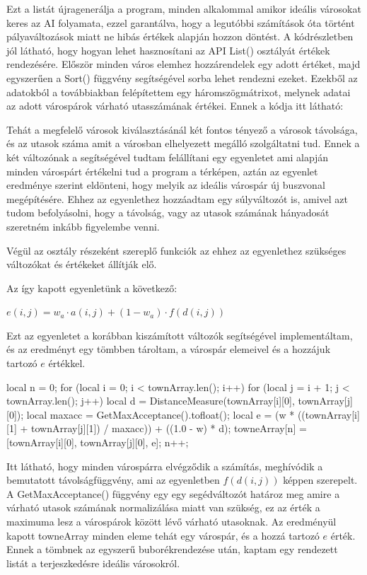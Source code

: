 Ezt a listát újragenerálja a program, minden alkalommal amikor ideális városokat keres az AI folyamata, ezzel garantálva, hogy a legutóbbi számítások óta történt pályaváltozások miatt ne hibás értékek alapján hozzon döntést. A kódrészletben jól látható, hogy hogyan lehet hasznosítani az API List() osztályát értékek rendezésére. Először minden város elemhez hozzárendelek egy adott értéket, majd egyszerűen a Sort() függvény segítségével sorba lehet rendezni ezeket. Ezekből az adatokból a továbbiakban felépítettem egy háromszögmátrixot, melynek adatai az adott várospárok várható utasszámának értékei. Ennek a kódja itt látható:

Tehát a megfelelő városok kiválasztásánál két fontos tényező a városok távolsága, és az utasok száma amit a városban elhelyezett megálló szolgáltatni tud. Ennek a két változónak a segítségével tudtam felállítani egy egyenletet ami alapján minden várospárt értékelni tud a program a térképen, aztán az egyenlet eredménye szerint eldönteni, hogy melyik az ideális várospár új buszvonal megépítésére. Ehhez az egyenlethez hozzáadtam egy súlyváltozót is, amivel azt tudom befolyásolni, hogy a távolság, vagy az utasok számának hányadosát szeretném inkább figyelembe venni.

Végül az osztály részeként szereplő funkciók az ehhez az egyenlethez szükséges változókat és értékeket állítják elő.

Az így kapott egyenletünk a következő:
\begin{center}
	$ e(i,j)=w_{a} \cdot a(i,j)+(1-w_{a}) \cdot f(d(i,j)) $
\end{center}

Ezt az egyenletet a korábban kiszámított változók segítségével implementáltam, és az eredményt egy tömbben tároltam, a várospár elemeivel és a hozzájuk tartozó $e$ értékkel.

\begin{cpp}
local n = 0;
for (local i = 0; i < townArray.len(); i++) {
  for (local j = i + 1; j < townArray.len(); j++) {
    local d = DistanceMeasure(townArray[i][0], townArray[j][0]);
    local maxacc = GetMaxAcceptance().tofloat();
    local e = (w * ((townArray[i][1] + townArray[j][1]) / maxacc))
      + ((1.0 - w) * d);
    towneArray[n] = [townArray[i][0], townArray[j][0], e];
    n++;
  }
}
\end{cpp}

Itt látható, hogy minden várospárra elvégződik a számítás, meghívódik a bemutatott távolságfüggvény, ami az egyenletben $f(d(i,j))$ képpen szerepelt. A GetMaxAcceptance() függvény egy egy segédváltozót határoz meg amire a várható utasok számának normalizálása miatt van szükség, ez az érték a maximuma lesz a várospárok között lévő várható utasoknak. Az eredményül kapott towneArray minden eleme tehát egy várospár, és a hozzá tartozó $e$ érték. Ennek a tömbnek az egyszerű buborékrendezése után, kaptam egy rendezett listát a terjeszkedésre ideális városokról.

